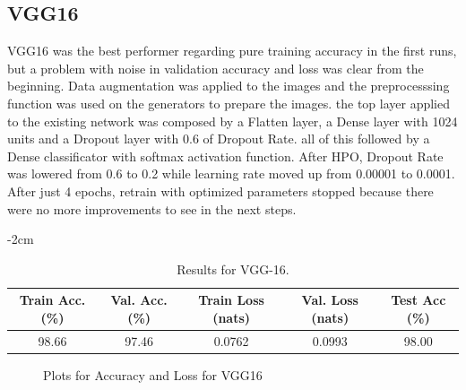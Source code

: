 \subsection{VGG16}
VGG16 was the best performer regarding pure training accuracy in the first runs, but a problem with noise in validation accuracy and loss was clear from the beginning. Data augmentation was applied to the images and the preprocesssing function was used on the generators to prepare the images. the top layer applied to the existing network was composed by a Flatten layer, a Dense layer with 1024 units and a Dropout layer with 0.6 of Dropout Rate. all of this followed by a Dense classificator with softmax activation function. After HPO, Dropout Rate was lowered from 0.6 to 0.2 while learning rate moved up from 0.00001 to 0.0001. After just 4 epochs, retrain with optimized parameters stopped because there were no more improvements to see in the next steps.
\begin{table}[H]
	\centering
    \addtolength{\leftskip} {-2cm} %
    \addtolength{\rightskip}{-2cm}
	\begin{tabular}{ |c|c|c|c|c| }
		\hline
		Train Acc. (\%)& Val. Acc. (\%) & Train Loss (nats) & Val. Loss (nats) & Test Acc (\%)\\
		\hline
		98.66 & 97.46 & 0.0762 & 0.0993 & 98.00\\
		\hline
	\end{tabular}
	\caption{Results for VGG-16.}
	\label{table:vgg16_res}
\end{table}
\begin{figure}[H]
\centering
{}
\hfill
{}
\caption{Plots for Accuracy and Loss for VGG16} 
\end{figure}

